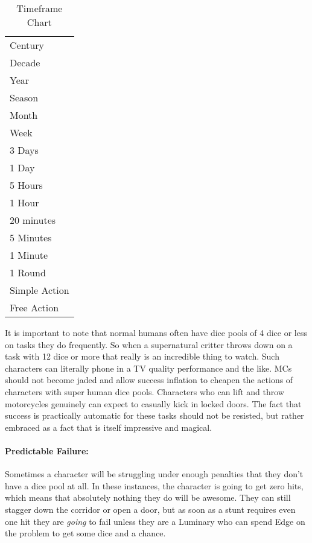 \begin{wraptable}[18]{R}{5cm}  \vspace{-.25cm}
\caption{Timeframe Chart} \centering
\begin{tabular}{l}
Century\\
Decade\\
Year\\
Season\\
Month\\
Week\\
3 Days\\
1 Day\\
5 Hours\\
1 Hour\\
20 minutes\\
5 Minutes\\
1 Minute\\
1 Round\\
Simple Action\\
Free Action\\
\end{tabular}
\end{wraptable}

It is important to note that normal humans often have dice pools of 4 dice or less on tasks they do frequently. So when a supernatural critter throws down on a task with 12 dice or more that really is an incredible thing to watch. Such characters can literally phone in a TV quality performance and the like. MCs should not become jaded and allow success inflation to cheapen the actions of characters with super human dice pools. Characters who can lift and throw motorcycles genuinely can expect to casually kick in locked doors. The fact that success is practically automatic for these tasks should not be resisted, but rather embraced as a fact that is itself impressive and magical.

\paragraph{Predictable Failure:} Sometimes a character will be struggling under enough penalties that they don't have a dice pool at all. In these instances, the character is going to get zero hits, which means that absolutely nothing they do will be awesome. They can still stagger down the corridor or open a door, but as soon as a stunt requires even one hit they are \textit{going} to fail unless they are a Luminary who can spend Edge on the problem to get some dice and a chance.

